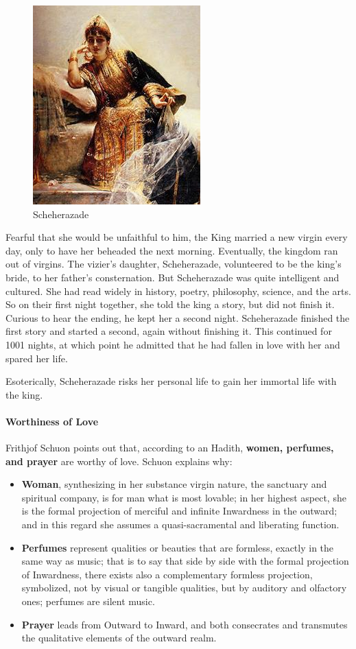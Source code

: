 \begin{figure}
\includegraphics[scale=.5]{a20201115TalesfromtheAnima-img001.jpg} 
\caption{Scheherazade}
\end{figure}

Fearful that she would be unfaithful to him, the King married a new virgin every day, only to have her beheaded the next morning. Eventually, the kingdom ran out of virgins. The vizier's daughter, Scheherazade, volunteered to be the king's bride, to her father's consternation. But Scheherazade was quite intelligent and cultured. She had read widely in history, poetry, philosophy, science, and the arts. So on their first night together, she told the king a story, but did not finish it. Curious to hear the ending, he kept her a second night. Scheherazade finished the first story and started a second, again without finishing it. This continued for 1001 nights, at which point he admitted that he had fallen in love with her and spared her life.

Esoterically, Scheherazade risks her personal life to gain her immortal life with the king.

\paragraph{Worthiness of Love}
Frithjof Schuon points out that, according to an Hadith, \textbf{women, perfumes, and prayer} are worthy of love. Schuon explains why:

\begin{itemize}
\item \textbf{Woman}, synthesizing in her substance virgin nature, the sanctuary and spiritual company, is for man what is most lovable; in her highest aspect, she is the formal projection of merciful and infinite Inwardness in the outward; and in this regard she assumes a quasi-sacramental and liberating function. 
\item \textbf{Perfumes} represent qualities or beauties that are formless, exactly in the same way as music; that is to say that side by side with the formal projection of Inwardness, there exists also a complementary formless projection, symbolized, not by visual or tangible qualities, but by auditory and olfactory ones; perfumes are silent music. 
\item \textbf{Prayer} leads from Outward to Inward, and both consecrates and transmutes the qualitative elements of the outward realm. 
\end{itemize}

